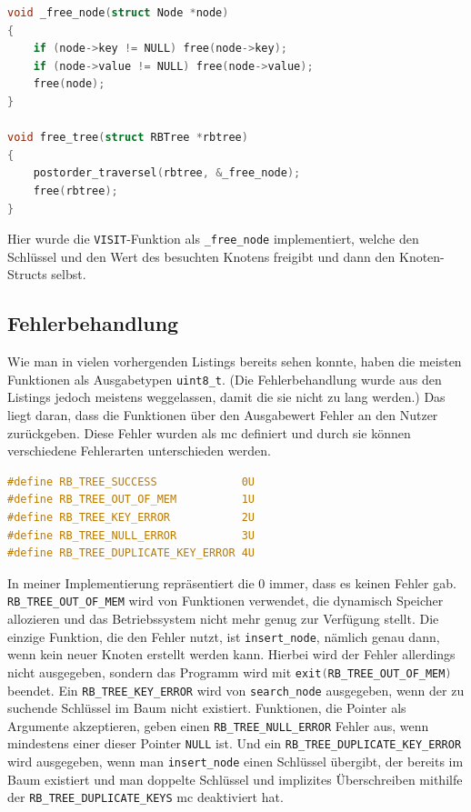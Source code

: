 \documentclass[11pt]{article}
\newcommand{\lstin}[1]{\lstinline[language=C]{#1}}
\begin{document}
\begin{lstlisting}[language=C]
void _free_node(struct Node *node)
{
    if (node->key != NULL) free(node->key);
    if (node->value != NULL) free(node->value);
    free(node);
}

void free_tree(struct RBTree *rbtree)
{
    postorder_traversel(rbtree, &_free_node);
    free(rbtree);
}
\end{lstlisting}

Hier wurde die \lstin{VISIT}-Funktion als \lstin{_free_node} implementiert, welche den Schlüssel und den Wert des besuchten Knotens freigibt und dann den Knoten-Structs selbst.

\subsection{Fehlerbehandlung} \label{err}
Wie man in vielen vorhergenden Listings bereits sehen konnte, haben die meisten Funktionen als Ausgabetypen \lstin{uint8_t}. (Die Fehlerbehandlung wurde aus den Listings jedoch meistens weggelassen, damit die sie nicht zu lang werden.)
Das liegt daran, dass die Funktionen über den Ausgabewert Fehler an den Nutzer zurückgeben. Diese Fehler wurden als \gls{mc} definiert und durch sie können verschiedene Fehlerarten unterschieden werden.

\begin{lstlisting}[language=C]
#define RB_TREE_SUCCESS             0U
#define RB_TREE_OUT_OF_MEM          1U
#define RB_TREE_KEY_ERROR           2U
#define RB_TREE_NULL_ERROR          3U
#define RB_TREE_DUPLICATE_KEY_ERROR 4U
\end{lstlisting}

In meiner Implementierung repräsentiert die 0 immer, dass es keinen Fehler gab.
\lstin{RB_TREE_OUT_OF_MEM} wird von Funktionen verwendet, die dynamisch Speicher allozieren und das Betriebssystem nicht mehr genug zur Verfügung stellt.
Die einzige Funktion, die den Fehler nutzt, ist \lstin{insert_node}, nämlich genau dann, wenn kein neuer Knoten erstellt werden kann.
Hierbei wird der Fehler allerdings nicht ausgegeben, sondern das Programm wird mit \lstin{exit(RB_TREE_OUT_OF_MEM)} beendet.
Ein \lstin{RB_TREE_KEY_ERROR} wird von \lstin{search_node} ausgegeben, wenn der zu suchende Schlüssel im Baum nicht existiert.
Funktionen, die Pointer als Argumente akzeptieren, geben einen \lstin{RB_TREE_NULL_ERROR} Fehler aus, wenn mindestens einer dieser Pointer \lstin{NULL} ist.
Und ein \lstin{RB_TREE_DUPLICATE_KEY_ERROR} wird ausgegeben, wenn man \lstin{insert_node} einen Schlüssel übergibt, der bereits im Baum existiert und man doppelte Schlüssel und implizites Überschreiben mithilfe der \lstin{RB_TREE_DUPLICATE_KEYS} \gls{mc} deaktiviert hat.
\end{document}
